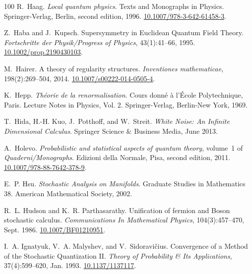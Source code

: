 \documentclass[11pt]{article}
\newcommand{\tmtextit}[1]{{\itshape{#1}}}
\begin{document}
\begin{thebibliography}{100}
  R.~Haag. {\newblock}\tmtextit{Local quantum physics}.
  {\newblock}Texts and Monographs in Physics. Springer-Verlag, Berlin, second
  edition, 1996. {\newblock}
  \href{https://doi.org/10.1007/978-3-642-61458-3}{10.1007/978-3-642-61458-3}.
  
  Z.~Haba and J.~Kupsch.
  {\newblock}Supersymmetry in Euclidean Quantum Field Theory.
  {\newblock}\tmtextit{Fortschritte der Physik/Progress of Physics},
  43(1):41--66, 1995. {\newblock}
  \href{https://doi.org/10.1002/prop.2190430103}{10.1002/prop.2190430103}.
  
  M.~Hairer. {\newblock}A theory of regularity
  structures. {\newblock}\tmtextit{Inventiones mathematicae}, 198(2):269--504,
  2014. {\newblock}
  \href{https://doi.org/10.1007/s00222-014-0505-4}{10.1007/s00222-014-0505-4}.
  
  K.~Hepp. {\newblock}\tmtextit{Th{\'e}orie de la
  renormalisation}. {\newblock}Cours donn{\'e} {\`a} l'{\'E}cole
  Polytechnique, Paris. Lecture Notes in Physics, Vol. 2. Springer-Verlag,
  Berlin-New York, 1969.
  
  T.~Hida, H.-H. Kuo, J.~Potthoff, and W.~Streit.
  {\newblock}\tmtextit{White Noise: An Infinite Dimensional Calculus}.
  {\newblock}Springer Science \& Business Media, June 2013.
  
  A.~Holevo. {\newblock}\tmtextit{Probabilistic and
  statistical aspects of quantum theory}, volume~1 of
  \tmtextit{Quaderni/Monographs}. {\newblock}Edizioni della Normale, Pisa,
  second edition, 2011. {\newblock}
  \href{https://doi.org/10.1007/978-88-7642-378-9}{10.1007/978-88-7642-378-9}.
  
  E.~P. Hsu. {\newblock}\tmtextit{Stochastic
  Analysis on Manifolds}. {\newblock}Graduate Studies in Mathematics 38.
  American Mathematical Society, 2002.
  
  R.~L. Hudson and K.~R. Parthasarathy.
  {\newblock}Unification of fermion and Boson stochastic calculus.
  {\newblock}\tmtextit{Communications In Mathematical Physics},
  104(3):457--470, Sept. 1986.
  {\newblock}\href{https://doi.org/10.1007/BF01210951}{10.1007/BF01210951}.
  
  I.~A. Ignatyuk, V.~A. Malyshev, and
  V.~Sidoravi{\v c}ius. {\newblock}Convergence of a Method of the Stochastic
  Quantization II. {\newblock}\tmtextit{Theory of Probability \& Its
  Applications}, 37(4):599--620, Jan. 1993.
  {\newblock}\href{https://doi.org/10.1137/1137117}{10.1137/1137117}.
  

\end{thebibliography}
\end{document}
